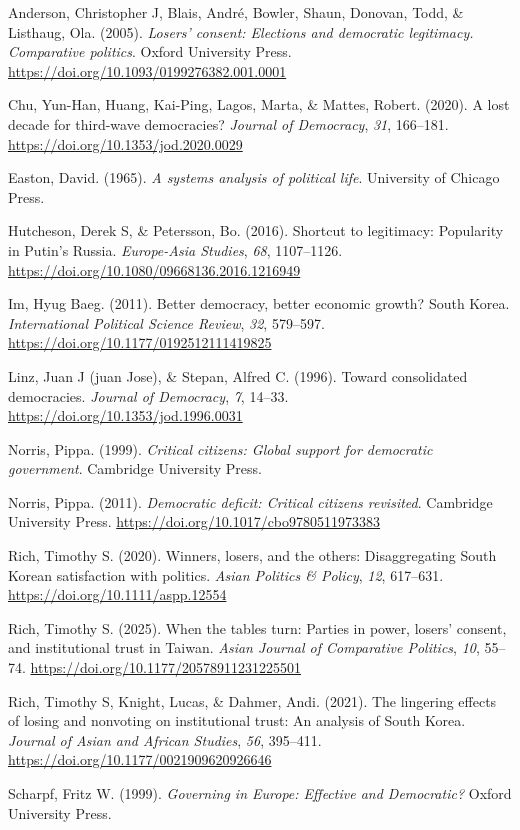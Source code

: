 \documentclass[
  12pt,
  letterpaper]{article}
\newlength{\cslhangindent}
\newenvironment{CSLReferences}[2] %
 {\begin{list}{}{%
  \setlength{\itemindent}{0pt}
  \setlength{\leftmargin}{0pt}
  \setlength{\parsep}{0pt}
  \ifodd #1
   \setlength{\leftmargin}{\cslhangindent}
   \setlength{\itemindent}{-1\cslhangindent}
  \fi
  \setlength{\itemsep}{#2\baselineskip}}}
 {\end{list}}
\begin{document}
\label{refs}
\begin{CSLReferences}{1}{0}
Anderson, Christopher J, Blais, André, Bowler, Shaun, Donovan, Todd, \&
Listhaug, Ola. (2005). \emph{{Losers' consent: Elections and democratic
legitimacy. Comparative politics}}. Oxford University Press.
\url{https://doi.org/10.1093/0199276382.001.0001}

Chu, Yun-Han, Huang, Kai-Ping, Lagos, Marta, \& Mattes, Robert. (2020).
{A lost decade for third-wave democracies?} \emph{Journal of Democracy},
\emph{31}, 166--181. \url{https://doi.org/10.1353/jod.2020.0029}

Easton, David. (1965). \emph{{A systems analysis of political life}}.
University of Chicago Press.

Hutcheson, Derek S, \& Petersson, Bo. (2016). {Shortcut to legitimacy:
Popularity in Putin's Russia}. \emph{Europe-Asia Studies}, \emph{68},
1107--1126. \url{https://doi.org/10.1080/09668136.2016.1216949}

Im, Hyug Baeg. (2011). {Better democracy, better economic growth? South
Korea}. \emph{International Political Science Review}, \emph{32},
579--597. \url{https://doi.org/10.1177/0192512111419825}

Linz, Juan J (juan Jose), \& Stepan, Alfred C. (1996). {Toward
consolidated democracies}. \emph{Journal of Democracy}, \emph{7},
14--33. \url{https://doi.org/10.1353/jod.1996.0031}

Norris, Pippa. (1999). \emph{{Critical citizens: Global support for
democratic government}}. Cambridge University Press.

Norris, Pippa. (2011). \emph{{Democratic deficit: Critical citizens
revisited}}. Cambridge University Press.
\url{https://doi.org/10.1017/cbo9780511973383}

Rich, Timothy S. (2020). {Winners, losers, and the others:
Disaggregating South Korean satisfaction with politics}. \emph{Asian
Politics \& Policy}, \emph{12}, 617--631.
\url{https://doi.org/10.1111/aspp.12554}

Rich, Timothy S. (2025). {When the tables turn: Parties in power,
losers' consent, and institutional trust in Taiwan}. \emph{Asian Journal
of Comparative Politics}, \emph{10}, 55--74.
\url{https://doi.org/10.1177/20578911231225501}

Rich, Timothy S, Knight, Lucas, \& Dahmer, Andi. (2021). {The lingering
effects of losing and nonvoting on institutional trust: An analysis of
South Korea}. \emph{Journal of Asian and African Studies}, \emph{56},
395--411. \url{https://doi.org/10.1177/0021909620926646}

Scharpf, Fritz W. (1999). \emph{{Governing in Europe: Effective and
Democratic?}} Oxford University Press.

\end{CSLReferences}
\end{document}
